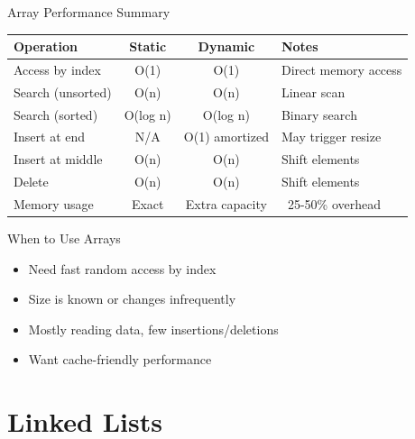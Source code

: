 \documentclass[aspectratio=169,xcolor=dvipsnames]{beamer}
\begin{document}
\begin{frame}{Array Performance Summary}
  \begin{center}
    \begin{tabular}{l|c|c|p{4cm}}
      \toprule
      \textbf{Operation} & \textbf{Static} & \textbf{Dynamic} & \textbf{Notes} \\
      \midrule
      Access by index & O(1) & O(1) & Direct memory access \\
      Search (unsorted) & O(n) & O(n) & Linear scan \\
      Search (sorted) & O(log n) & O(log n) & Binary search \\
      Insert at end & N/A & O(1) amortized & May trigger resize \\
      Insert at middle & O(n) & O(n) & Shift elements \\
      Delete & O(n) & O(n) & Shift elements \\
      Memory usage & Exact & Extra capacity & ~25-50\% overhead \\
      \bottomrule
    \end{tabular}
  \end{center}

  \vspace{0.5cm}

  \begin{block}{When to Use Arrays}
    \begin{itemize}
      \item Need fast random access by index
      \item Size is known or changes infrequently
      \item Mostly reading data, few insertions/deletions
      \item Want cache-friendly performance
    \end{itemize}
  \end{block}
\end{frame}

\section{Linked Lists}
\end{document}
